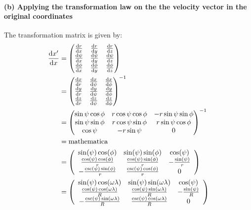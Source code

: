 \documentclass{article}
\begin{document}
\paragraph{(b) Applying the transformation law on the the velocity vector in the original coordinates}
The transformation matrix is given by:
\begin{equation*}
\begin{split}
    \dv{x'}{x} &=\begin{pmatrix}
        \dv{r}{x} & \dv{r}{y} & \dv{r}{z}\\
        \dv{\psi}{x} & \dv{\psi}{y} & \dv{\psi}{z}\\
        \dv{\phi}{x} & \dv{\phi}{y} & \dv{\phi}{z}
    \end{pmatrix}\\
    &=\begin{pmatrix}
        \dv{x}{r} & \dv{x}{\psi} & \dv{x}{\phi}\\
        \dv{y}{r} & \dv{y}{\psi} & \dv{y}{\phi}\\
        \dv{z}{r} & \dv{z}{\psi} & \dv{z}{\phi}
    \end{pmatrix}^{-1}\\
    &=\begin{pmatrix}
        \sin \psi \cos \phi & r\cos \psi \cos \phi & -r\sin \psi \sin \phi\\
        \sin \psi \sin \phi & r\cos \psi \sin \phi & r\sin \psi \cos \phi\\
        \cos \psi  & -r\sin \psi & 0
    \end{pmatrix}^{-1}\\
    &=\text{mathematica}\\
    &=\left(
\begin{array}{ccc}
 \sin (\psi) \cos (\phi) & \sin (\psi) \sin (\phi) & \cos (\psi) \\
 \frac{\cos (\psi) \cos (\phi)}{r} & \frac{\cos (\psi) \sin (\phi)}{r} & -\frac{\sin (\psi)}{r} \\
 -\frac{\csc (\psi) \sin (\phi)}{r} & \frac{\csc (\psi) \cos (\phi)}{r} & 0 \\
\end{array}
\right)\\
&=\left(
\begin{array}{ccc}
 \sin (\psi) \cos (\omega \lambda) & \sin (\psi) \sin (\omega \lambda) & \cos (\psi) \\
 \frac{\cos (\psi) \cos (\omega \lambda)}{R} & \frac{\cos (\psi) \sin (\omega \lambda)}{R} & -\frac{\sin (\psi)}{R} \\
 -\frac{\csc (\psi) \sin (\omega \lambda)}{R} & \frac{\csc (\psi) \cos (\omega \lambda)}{R} & 0 \\
\end{array}
\right)
    \end{split}
\end{equation*}
\end{document}
